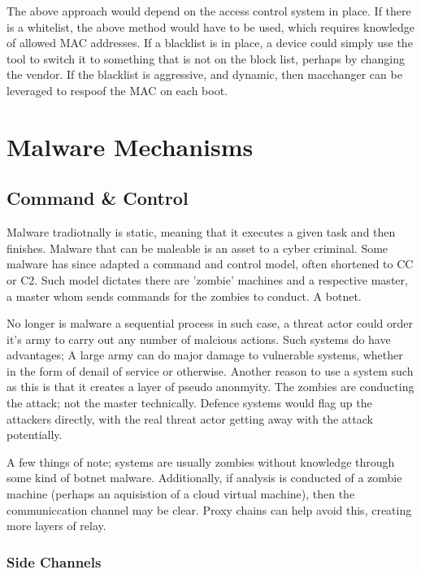 The above approach would depend on the access control system in place. If there is a whitelist, the above method would have to be used, which requires knowledge of allowed MAC addresses. If a blacklist is in place, a device could simply use the tool to switch it to something that is not on the block list, perhaps by changing the vendor. If the blacklist is aggressive, and dynamic, then macchanger can be leveraged to respoof the MAC on each boot.



\chapter{Malware Mechanisms}

\section{Command \& Control}
Malware tradiotnally is static, meaning that it executes a given task and then finishes. Malware that can be maleable is an asset to a cyber criminal. 
Some malware has since adapted a command and control model, often shortened to CC or C2. Such model dictates there are 'zombie' machines and a respective master, a master whom sends commands for the zombies to conduct. A botnet.

No longer is malware a sequential process in such case, a threat actor could order it's army to carry out any number of malcious actions. Such systems do have advantages; A large army can do major damage to vulnerable systems, whether in the form of denail of service or otherwise.
Another reason to use a system such as this is that it creates a layer of pseudo anonmyity. The zombies are conducting the attack; not the master technically. Defence systems would flag up the attackers directly, with the real threat actor getting away with the attack potentially.

A few things of note; systems are usually zombies without knowledge through some kind of botnet malware. Additionally, if analysis is conducted of a zombie machine (perhaps an aquisistion of a cloud virtual machine), then the communiccation channel may be clear. Proxy chains can help avoid this, creating more layers of relay.

\subsection{Side Channels}
